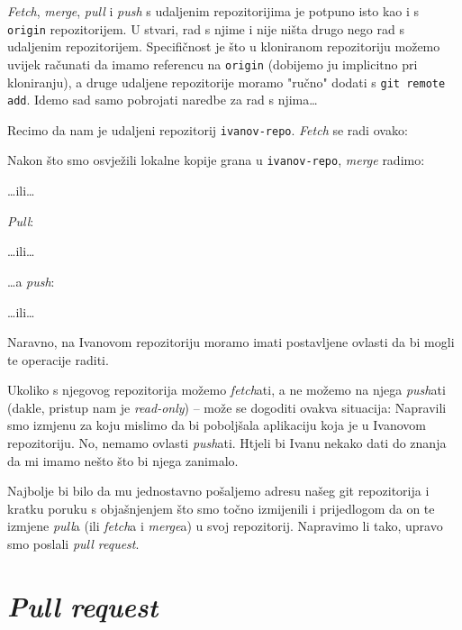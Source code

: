 \emph{Fetch}, \emph{merge}, \emph{pull} i \emph{push} s udaljenim repozitorijima je potpuno isto kao i s \verb+origin+ repozitorijem.
U stvari, rad s njime i nije ništa drugo nego rad s udaljenim repozitorijem. 
Specifičnost je što u kloniranom repozitoriju možemo uvijek računati da imamo referencu na \verb+origin+ (dobijemo ju implicitno pri kloniranju), a druge udaljene repozitorije moramo "ručno" dodati s \verb+git remote add+.
Idemo sad samo pobrojati naredbe za rad s njima\dots

Recimo da nam je udaljeni repozitorij \verb+ivanov-repo+.
\emph{Fetch} se radi ovako:


Nakon što smo osvježili lokalne kopije grana u \verb+ivanov-repo+, \emph{merge} radimo:


\dots{}ili\dots


\emph{Pull}:


\dots{}ili\dots


\dots{}a \emph{push}:


\dots{}ili\dots


Naravno, na Ivanovom repozitoriju moramo imati postavljene ovlasti da bi mogli te operacije raditi.

Ukoliko s njegovog repozitorija možemo \emph{fetch}ati, a ne možemo na njega \emph{push}ati (dakle, pristup nam je \emph{read-only}) -- može se dogoditi ovakva situacija:
Napravili smo izmjenu za koju mislimo da bi poboljšala aplikaciju koja je u Ivanovom repozitoriju.
No, nemamo ovlasti \emph{push}ati.
Htjeli bi Ivanu nekako dati do znanja da mi imamo nešto što bi njega zanimalo.

Najbolje bi bilo da mu jednostavno pošaljemo adresu našeg git repozitorija i kratku poruku s objašnjenjem što smo točno izmijenili i prijedlogom da on te izmjene \emph{pull}a (ili \emph{fetch}a i \emph{merge}a) u svoj repozitorij.
Napravimo li tako, upravo smo poslali \emph{pull request}.

\section*{\emph{Pull request}}

